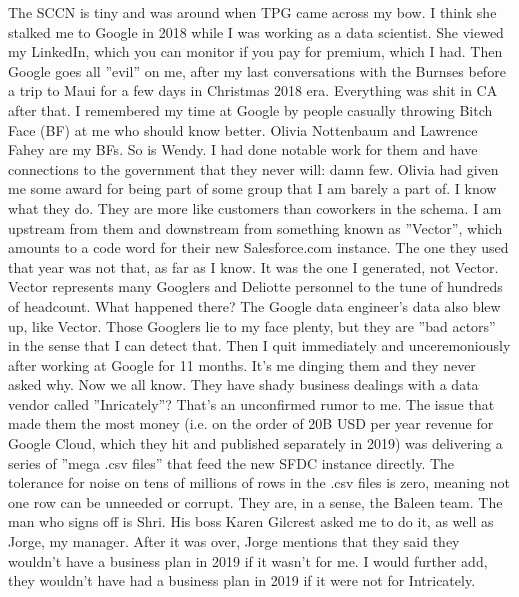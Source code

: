 \documentclass{article}
\begin{document}
\begin{multicols}{2}
The SCCN is tiny and was around when TPG came across my bow. I think she stalked me to Google in 2018 while I was working as a data scientist. She viewed my LinkedIn, which you can monitor if you pay for premium, which I had. Then Google goes all ''evil'' \cite{liepeople} \cite{onevil} on me, after my last conversations with the Burnses before a trip to Maui for a few days in Christmas 2018 era. Everything was shit in CA after that. I remembered my time at Google by people casually throwing Bitch Face (BF) at me who should know better. Olivia Nottenbaum and Lawrence Fahey are my BFs. So is Wendy. I had done notable work for them and have connections to the government that they never will: damn few. Olivia had given me some award for being part of some group that I am barely a part of. I know what they do. They are more like customers than coworkers in the schema. I am upstream from them and downstream from something known as ''Vector'', which amounts to a code word for their new Salesforce.com instance. The one they used that year was not that, as far as I know. It was the one I generated, not Vector. Vector represents many Googlers and Deliotte personnel to the tune of hundreds of headcount. What happened there? The Google data engineer's data also blew up, like Vector. Those Googlers lie to my face plenty, but they are ''bad actors'' in the sense that I can detect that. Then I quit immediately and unceremoniously after working at Google for 11 months. It's me dinging them and they never asked why. Now we all know. They have shady business dealings with a data vendor called ''Inricately''? That's an unconfirmed rumor to me. The issue that made them the most money (i.e. on the order of 20B USD per year revenue for Google Cloud, which they hit and published separately in 2019) was delivering a series of ''mega .csv files'' that feed the new SFDC instance directly. The tolerance for noise on tens of millions of rows in the .csv files is zero, meaning not one row can be unneeded or corrupt. They are, in a sense, the Baleen team. The man who signs off is Shri. His boss Karen Gilcrest asked me to do it, as well as Jorge, my manager. After it was over, Jorge mentions that they said they wouldn't have a business plan in 2019 if it wasn't for me. I would further add, they wouldn't have had a business plan in 2019 if it were not for Intricately. 


\end{multicols}
\end{document}
